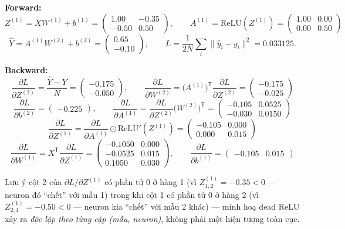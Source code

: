 \documentclass[12pt,a4paper]{article}
\newcommand{\T}{^{\mathsf{T}}}
\begin{document}
\textbf{Forward:}
$$Z^{(1)}=XW^{(1)}+b^{(1)} = \begin{pmatrix}1.00 & -0.35\\ -0.50 & 0.50\end{pmatrix},\qquad
A^{(1)}=\mathrm{ReLU}(Z^{(1)}) = \begin{pmatrix}1.00 & 0.00\\ 0.00 & 0.50\end{pmatrix}$$
$$\hat Y = A^{(1)}W^{(2)}+b^{(2)} = \begin{pmatrix}0.65\\ -0.10\end{pmatrix},\qquad
L=\frac{1}{2N}\sum_i\lVert \hat y_i-y_i\rVert^2 = 0.033125.$$

\textbf{Backward:}
$$\frac{\partial L}{\partial Z^{(2)}} = \frac{\hat Y-Y}{N} = \begin{pmatrix}-0.175\\ -0.050\end{pmatrix},\qquad
\frac{\partial L}{\partial W^{(2)}} = \big(A^{(1)}\big)\T\frac{\partial L}{\partial Z^{(2)}} = \begin{pmatrix}-0.175\\ -0.025\end{pmatrix}$$
$$\frac{\partial L}{\partial b^{(2)}} = \begin{pmatrix}-0.225\end{pmatrix},\qquad
\frac{\partial L}{\partial A^{(1)}} = \frac{\partial L}{\partial Z^{(2)}}\big(W^{(2)}\big)\T = \begin{pmatrix}-0.105 & 0.0525\\ -0.030 & 0.0150\end{pmatrix}$$
$$\frac{\partial L}{\partial Z^{(1)}} = \frac{\partial L}{\partial A^{(1)}}\odot\mathrm{ReLU}'(Z^{(1)}) = \begin{pmatrix}-0.105 & 0.000\\ 0.000 & 0.015\end{pmatrix}$$
$$\frac{\partial L}{\partial W^{(1)}} = X\T\frac{\partial L}{\partial Z^{(1)}} = \begin{pmatrix}-0.1050 & 0.000\\ -0.0525 & 0.015\\ 0.1050 & 0.030\end{pmatrix},\qquad
\frac{\partial L}{\partial b^{(1)}} = \begin{pmatrix}-0.105 & 0.015\end{pmatrix}$$

Lưu ý cột 2 của $\partial L/\partial Z^{(1)}$ có phần tử $0$ ở hàng 1 (vì
$Z^{(1)}_{1,2}=-0.35<0$ --- neuron đó ``chết'' với mẫu 1) trong khi cột 1
có phần tử $0$ ở hàng 2 (vì $Z^{(1)}_{2,1}=-0.50<0$ --- neuron kia
``chết'' với mẫu 2 khác) --- minh hoạ dead ReLU xảy ra \emph{độc lập theo
từng cặp (mẫu, neuron)}, không phải một hiện tượng toàn cục.
\end{document}
